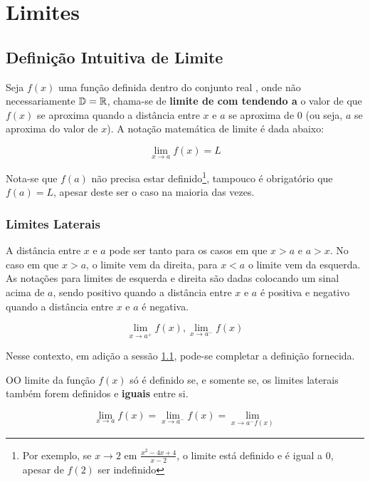 \chapter{Limites}%
\label{chap:limites}

\section{Definição Intuitiva de Limite}%
\label{sec:def-intuitiva-lim}

Seja $f(x)$ uma função definida dentro do conjunto real \R, onde não necessariamente \(\mathbb{D} = \mathbb{R}\), chama-se de \textbf{limite de  com  tendendo a } o valor de que $f(x)$ se aproxima quando a distância entre $x$ e $a$ se aproxima de 0 (ou seja, $a$ se aproxima do valor de $x$). A notação matemática de limite é dada abaixo:

\begin{equation}
  \lim_{x\to a} f(x) = L
\end{equation}

Nota-se que $f(a)$ não precisa estar definido\footnote{Por exemplo, se $x\to 2$ em $\frac{x^{2} - 4x + 4}{x - 2}$, o limite está definido e é igual a 0, apesar de $f(2)$ ser indefinido}, tampouco é obrigatório que $f(a) = L$, apesar deste ser o caso na maioria das vezes.

\subsection{Limites Laterais}

A distância entre $x$ e $a$ pode ser tanto para os casos em que $x>a$ e $a>x$. No caso em que $x>a$, o limite vem da direita, para $x<a$ o limite vem da esquerda. As notações para limites de esquerda e direita são dadas colocando um sinal acima de $a$, sendo positivo quando a distância entre $x$ e $a$ é positiva e negativo quando a distância entre $x$ e $a$ é negativa.

\begin{equation*}
  \lim_{x\to a^{+}} f(x),  \lim_{x\to a^{-}} f(x)
\end{equation*}

Nesse contexto, em adição a sessão \ref{sec:def-intuitiva-lim}, pode-se completar a definição fornecida.

\begin{defin}%
  OO limite da função $f(x)$ só é definido se, e somente se, os limites laterais
também forem definidos e \textbf{iguais} entre si.

  \begin{equation*}
    \lim_{x\to a} f(x) = \lim_{x\to a^{-}} f(x) = \lim_{x\to a^{-} f(x)}
  \end{equation*}
\end{defin}

